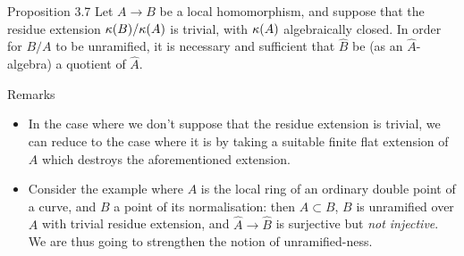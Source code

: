 \begin{itenv}{Proposition 3.7}
  Let $A\to B$ be a local homomorphism, and suppose that the residue extension $\kappa(B)/\kappa(A)$ is trivial, with $\kappa(A)$ algebraically closed.
  In order for $B/A$ to be unramified, it is necessary and sufficient that $\widehat{B}$ be (as an $\widehat{A}$-algebra) a quotient of $\widehat{A}$.
\end{itenv}

\begin{rmenv}{Remarks}
  \begin{itemize}
    \item In the case where we don't suppose that the residue extension is trivial, we can reduce to the case where it is by taking a suitable finite flat extension of $A$ which destroys the aforementioned extension.
    \item Consider the example where $A$ is the local ring of an ordinary double point of a curve, and $B$ a point of its normalisation:
      then $A\subset B$, $B$ is unramified over $A$ with trivial residue extension,
      and $\widehat{A}\to\widehat{B}$ is surjective but \emph{not injective}.
    We are thus going to strengthen the notion of unramified-ness.
  \end{itemize}
\end{rmenv}
